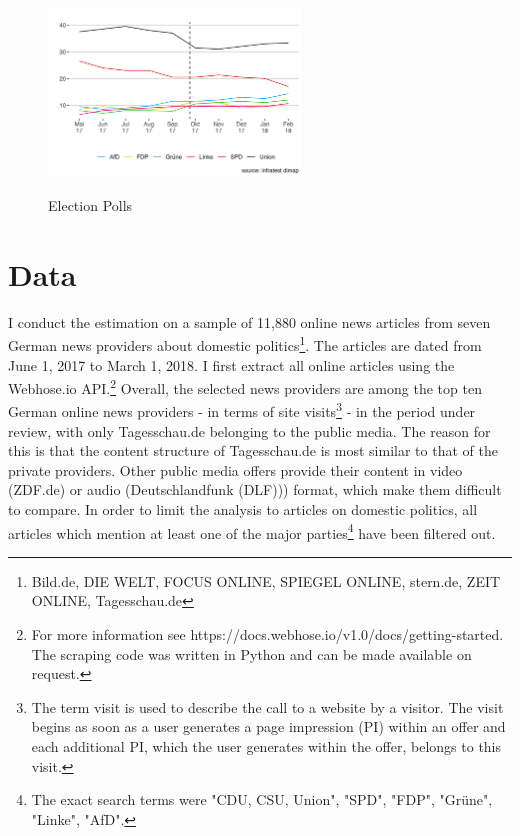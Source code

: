 \documentclass[12pt,a4paper,notitlepage]{article}
\begin{document}
\begin{figure}[H]
\begin{center}
	\caption{Election Polls}
	\includegraphics[width=0.6\textwidth]{../figs/polls}
	\label{fig_polls}
	\end{center}
\end{figure}

\section{Data}\label{ch_data}



I conduct the estimation on a sample of 11,880 online news articles from seven German news providers about domestic politics\footnote{Bild.de, DIE WELT, FOCUS ONLINE, SPIEGEL ONLINE, stern.de, ZEIT ONLINE, Tagesschau.de}. The articles are dated from June 1, 2017 to March 1, 2018. I first extract all online articles using the Webhose.io API.\footnote{For more information see https://docs.webhose.io/v1.0/docs/getting-started. The scraping code was written in Python and can be made available on request.} Overall, the selected news providers are among the top ten German online news providers - in terms of site visits\footnote{The term visit is used to describe the call to a website by a visitor. The visit begins as soon as a user generates a page impression (PI) within an offer and each additional PI, which the user generates within the offer, belongs to this visit.} - in the period under review, with only Tagesschau.de belonging to the public media. The reason for this is that the content structure of Tagesschau.de is most similar to that of the private providers. Other public media offers provide their content in video (ZDF.de) or audio (Deutschlandfunk (DLF))) format, which make them difficult to compare. In order to limit the analysis to articles on domestic politics, all articles which mention at least one of the major parties\footnote{The exact search terms were "CDU, CSU, Union", "SPD", "FDP", "Grüne", "Linke", "AfD".} have been filtered out. 
\end{document}
